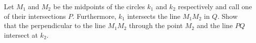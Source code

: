 Let $M_1$ and $M_2$ be the midpoints of the circles $k_1$ and $k_2$ respectively and call
one of their intersections $P$. Furthermore, $k_1$ intersects the line $M_1M_2$ in $Q$.
Show that the perpendicular to the line $M_1M_2$ through the point $M_2$ and the line $PQ$ intersect at $k_2$.
